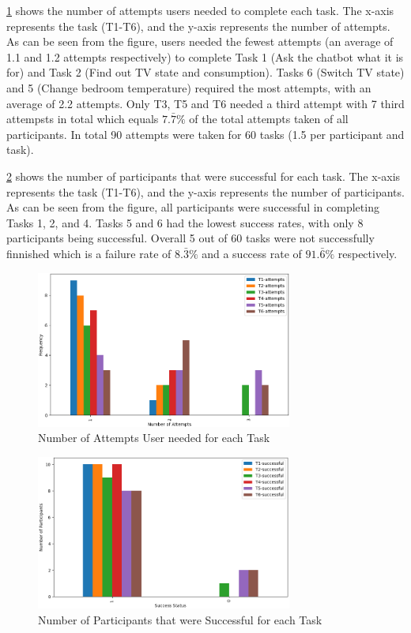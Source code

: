 \cref{fig:task-attempts} shows the number of attempts users needed to complete each task. The x-axis represents the task (T1-T6), and the y-axis represents the number of attempts. As can be seen from the figure, users needed the fewest attempts (an average of 1.1 and 1.2 attempts respectively) to complete Task 1 (Ask the chatbot what it is for) and Task 2 (Find out TV state and consumption). Tasks 6 (Switch TV state) and 5 (Change bedroom temperature) required the most attempts, with an average of 2.2 attempts.
Only T3, T5 and T6 needed a third attempt with 7 third attempsts in total which equals $7.\bar{7}\%$ of the total attempts taken of all participants. In total 90 attempts were taken for 60 tasks (1.5 per participant and task). 

\cref{fig:task-success} shows the number of participants that were successful for each task. The x-axis represents the task (T1-T6), and the y-axis represents the number of participants. As can be seen from the figure, all participants were successful in completing Tasks 1, 2, and 4. Tasks 5 and 6 had the lowest success rates, with only 8 participants being successful. Overall 5 out of 60 tasks were not successfully finnished which is a failure rate of $8.\bar{3}\%$ and a success rate of $91.\bar{6}\%$ respectively.

\begin{figure}[h]
    \centering
    \captionsetup{justification=centering}
    \includegraphics[width=0.75\textwidth]{graphics/task-attempts.png}
    \caption{Number of Attempts User needed for each Task}
    \label{fig:task-attempts}
\end{figure}
\begin{figure}[h]
    \centering
    \captionsetup{justification=centering}
    \includegraphics[width=0.75\textwidth]{graphics/task-success.png}
    \caption{Number of Participants that were Successful for each Task}
    \label{fig:task-success}
\end{figure}

